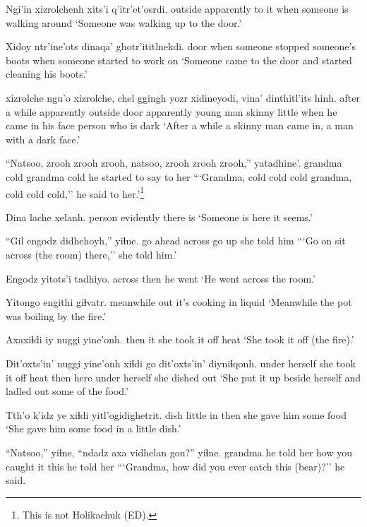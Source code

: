 \documentclass[12pt]{article}
\begin{document}
\gll Ngi'in xizrolchenh xits'i q'itr'et'osrdi.
outside apparently {to it} {when someone is walking around}
\glt `Someone was walking up to the door.'
\glend

\gll Xidoy ntr'ine'ots dinaqa' ghotr'ititlnekdi.
door {when someone stopped} {someone's boots} {when someone started to work on}
\glt `Someone came to the door and started cleaning his boots.'
\glend

 xizrolche ngu'o xizrolche, chel ggingh yozr xidineyodi, vina' {dinthitl'its hinh}.
{after a while} apparently {outside door} apparently {young man} skinny little {when he came in} {his face} {person who is dark}
\glt `After a while a skinny man came in, a man with a dark face.'
\glend

\gll ``Natsoo, zrooh zrooh zrooh, natsoo, zrooh zrooh zrooh,'' yatadhine'.
grandma cold {} {} grandma cold {} {} {he started to say to her}
\glt ```Grandma, cold cold cold grandma, cold cold cold,'' he said to her.'\footnote{This is not Holikachuk (ED).}
\glend

\gll Dina lache xelanh.
person evidently {there is}
\glt `Someone is here it seems.'
\glend

\gll ``Gil engodz didhehoyh,'' yiɬne.
{go ahead} across {go up} {she told him}
\glt ```Go on sit across (the room) there,'' she told him.'
\glend

\gll Engodz yitots'i tadhiyo.
across then {he went}
\glt `He went across the room.'
\glend

\gll Yitongo engithi giɬvatr.
meanwhile out {it's cooking in liquid}
\glt `Meanwhile the pot was boiling by the fire.'
\glend

\gll Axaxiɬdi iy {nuggi yine'onh.}
then it {she took it off heat}
\glt `She took it off (the fire).'
\glend

\gll Dit'oxts'in' {nuggi yine'onh} xiɬdi go dit'oxts'in' diyniɬqonh.
{under herself} {she took it off heat} then here {under herself} {she dished out}
\glt `She put it up beside herself and ladled out some of the food.'
\glend

\gll Tth'o k'idz ye xiɬdi yitl'ogidighetrit.
dish little in then {she gave him some food}
\glt `She gave him some food in a little dish.'
\glend

\gll ``Natsoo,'' yiɬne, {``ndadz axa} vidhelan gon?'' yiɬne.
grandma {he told her} {how} {you caught it} this {he told her}
\glt ```Grandma, how did you ever catch this (bear)?'' he said.
\glend
\end{document}
